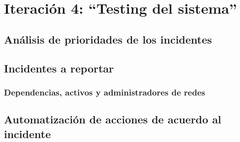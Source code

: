 \chapter{Iteración 4: “Testing del sistema”}
    \section{Análisis de prioridades de los incidentes}
    \section{Incidentes a reportar}
        \subsection{Dependencias, activos y administradores de redes}
    \section{Automatización de acciones de acuerdo al incidente}